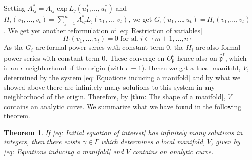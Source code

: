 \documentclass{article}
\newtheorem{theorem}{Theorem}[section]
\newcommand{\mfrak}[1]{\mathfrak{#1}}
\numberwithin{equation}{section}
\begin{document}
Setting $A_{ij}^* = A_{ij} \exp L_j(u_1^*, ..., u_t^*)$ and $H_i(v_1, ..., v_t) = \sum_{j = 1}^n A_{ij}^* L_j(v_1, ..., v_t)$, we get
$G_i(u_1, ..., u_t) = H_i(v_1, ..., v_t)$. We get yet another reformulation of \cref{eq: Restriction of variables}
\begin{equation}\label{eq: Equations inducing a manifold}
    H_i(v_1, ..., v_t) = 0 \text{ for all } i \in \{m+1, ..., n\}
\end{equation}
As the $G_i$ are formal power series with constant term 0, the $H_i$ are also formal power series with constant term 0. These converge on $O_\mfrak p^t$ hence also on $\hat {\mfrak p}^t$, which is an $\epsilon$-neighborhood of the origin (with $\epsilon$ = 1). Hence we get a local manifold, $V$, determined by the system \cref{eq: Equations inducing a manifold} and by what we showed above there are infinitely many solutions to this system in any neighborhood of the origin. Therefore, by \cref{thm: The shape of a manifold}, $V$ contains an analytic curve. We summarize what we have found in the following theorem. 
\begin{theorem}\label{thm: Skolems method}
    If \cref{eq: Initial equation of interest} has infinitely many solutions in integers, then there exists $\gamma \in \Gamma$ which determines a local manifold, $V$, given by \cref{eq: Equations inducing a manifold} and $V$ contains an analytic curve.
\end{theorem}
\end{document}

